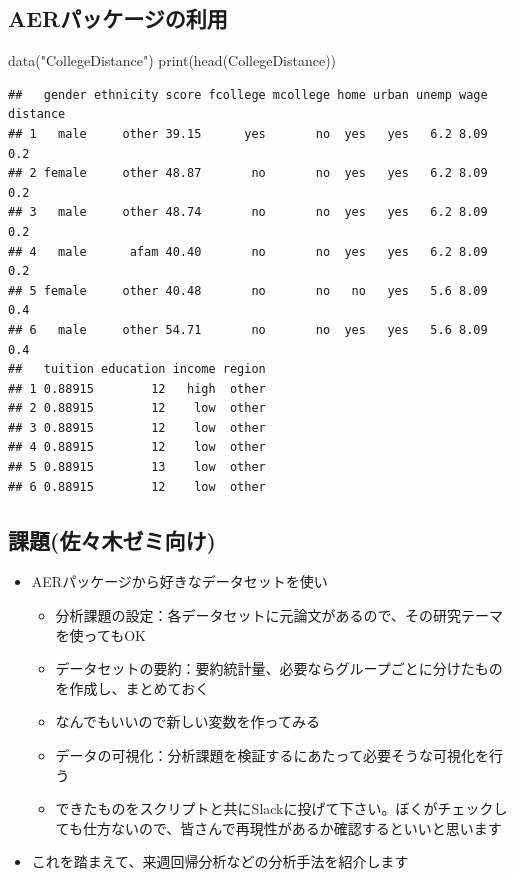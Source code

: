 \documentclass[
]{ltjsarticle}
\newenvironment{Shaded}{\begin{snugshade}}{\end{snugshade}}
\newcommand{\FunctionTok}[1]{\textcolor[rgb]{0.00,0.00,0.00}{#1}}
\newcommand{\NormalTok}[1]{#1}
\newcommand{\StringTok}[1]{\textcolor[rgb]{0.31,0.60,0.02}{#1}}
\providecommand{\tightlist}{%
  \setlength{\itemsep}{0pt}\setlength{\parskip}{0pt}}
\begin{document}
\hypertarget{aerux30d1ux30c3ux30b1ux30fcux30b8ux306eux5229ux7528}{%
\subsection{AERパッケージの利用}\label{aerux30d1ux30c3ux30b1ux30fcux30b8ux306eux5229ux7528}}

\begin{Shaded}
\begin{Highlighting}[]
\FunctionTok{data}\NormalTok{(}\StringTok{"CollegeDistance"}\NormalTok{)}
\FunctionTok{print}\NormalTok{(}\FunctionTok{head}\NormalTok{(CollegeDistance))}
\end{Highlighting}
\end{Shaded}

\begin{verbatim}
##   gender ethnicity score fcollege mcollege home urban unemp wage distance
## 1   male     other 39.15      yes       no  yes   yes   6.2 8.09      0.2
## 2 female     other 48.87       no       no  yes   yes   6.2 8.09      0.2
## 3   male     other 48.74       no       no  yes   yes   6.2 8.09      0.2
## 4   male      afam 40.40       no       no  yes   yes   6.2 8.09      0.2
## 5 female     other 40.48       no       no   no   yes   5.6 8.09      0.4
## 6   male     other 54.71       no       no  yes   yes   5.6 8.09      0.4
##   tuition education income region
## 1 0.88915        12   high  other
## 2 0.88915        12    low  other
## 3 0.88915        12    low  other
## 4 0.88915        12    low  other
## 5 0.88915        13    low  other
## 6 0.88915        12    low  other
\end{verbatim}

\hypertarget{ux8ab2ux984cux4f50ux3005ux6728ux30bcux30dfux5411ux3051}{%
\subsection{課題(佐々木ゼミ向け)}\label{ux8ab2ux984cux4f50ux3005ux6728ux30bcux30dfux5411ux3051}}

\begin{itemize}
\tightlist
\item
  AERパッケージから好きなデータセットを使い

  \begin{itemize}
  \tightlist
  \item
    分析課題の設定：各データセットに元論文があるので、その研究テーマを使ってもOK
  \item
    データセットの要約：要約統計量、必要ならグループごとに分けたものを作成し、まとめておく
  \item
    なんでもいいので新しい変数を作ってみる
  \item
    データの可視化：分析課題を検証するにあたって必要そうな可視化を行う
  \item
    できたものをスクリプトと共にSlackに投げて下さい。ぼくがチェックしても仕方ないので、皆さんで再現性があるか確認するといいと思います
  \end{itemize}
\item
  これを踏まえて、来週回帰分析などの分析手法を紹介します
\end{itemize}
\end{document}
